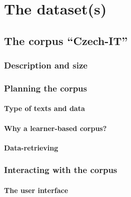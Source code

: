 \documentclass[
  a4paper,
  twoside,
  12pt,
  chapterprefix=false,
  bibliography=totocnumbered,
  listof=flat]{scrbook}
\begin{document}
\hypertarget{the-datasets}{%
\chapter{The dataset(s)}\label{the-datasets}}

\hypertarget{the-corpus-czech-it}{%
\section{The corpus ``Czech-IT''}\label{the-corpus-czech-it}}

\hypertarget{description-and-size-1}{%
\subsection{Description and size}\label{description-and-size-1}}

\hypertarget{planning-the-corpus}{%
\subsection{Planning the corpus}\label{planning-the-corpus}}

\hypertarget{type-of-texts-and-data}{%
\subsubsection{Type of texts and data}\label{type-of-texts-and-data}}

\hypertarget{why-a-learner-based-corpus}{%
\subsubsection{Why a learner-based corpus?}\label{why-a-learner-based-corpus}}

\hypertarget{data-retrieving}{%
\subsubsection{Data-retrieving}\label{data-retrieving}}

\hypertarget{interacting-with-the-corpus}{%
\subsection{Interacting with the corpus}\label{interacting-with-the-corpus}}

\hypertarget{the-user-interface}{%
\subsubsection{The user interface}\label{the-user-interface}}
\end{document}
